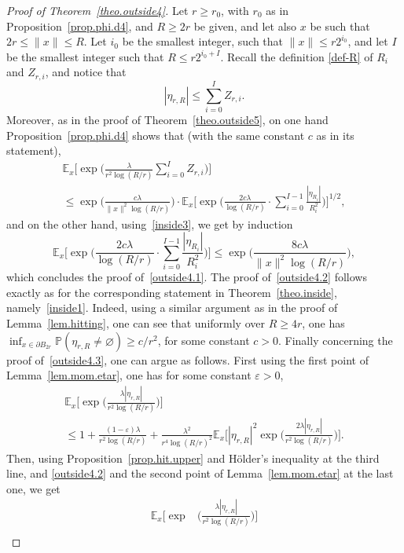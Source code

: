 \documentclass[JEP,XML,SOM,Unicode,NoFloatCountersInSection,published]{cedram}
\let\ts\textstyle
\theoremstyle{plain}
\theoremstyle{definition}
\newcommand{\1}{{\text{\Large $\mathfrak 1$}}}
\begin{document}
\begin{proof}[Proof of Theorem~\ref{theo.outside4}]
Let $r\ge r_0$, with $r_0$ as in Proposition~\ref{prop.phi.d4}, and $R\ge 2r$ be given, and let also $x$ be such
that $2r\le \|x\|\le R$. Let $i_0$ be the smallest integer,
such that $\|x\|\le r2^{i_0}$,
and let $I$ be the smallest integer such that $R\le r2^{i_0+I}$.
Recall the definition \eqref{def-R} of $R_i$ and $Z_{r,i}$, and notice that
\[
|\eta_{r,R}| \le \sum_{i=0}^I Z_{r,i}.
\]
Moreover, as in the proof of Theorem~\ref{theo.outside5}, on one hand Proposition~\ref{prop.phi.d4} shows that (with the same constant $c$ as in its statement),
\begin{multline*}
\mathbb E_x\Big[\exp\Big(\frac{\lambda}{r^2\log(R/r)}
{\ts\sum_{i=0}^I} Z_{r,i}\Big)\Big]\\
\le\exp\Big(\frac{c\lambda}{\|x\|^2\log(R/r)}\Big)
\cdot \mathbb E_x\Big[ \exp\Big(\frac{2c\lambda}{\log(R/r)}
\cdot {\ts\sum_{i=0}^{I-1}} \frac{ |\eta_{R_i}|}{R_i^2}\Big)\Big]^{1/2},
\end{multline*}
and on the other hand, using~\eqref{inside3}, we get by induction
\[
\mathbb E_x\Big[ \exp\Big(\frac{2c\lambda}{\log(R/r)}\cdot {\ts\sum_{i=0}^{I-1}}
\frac{ |\eta_{R_i}|}{R_i^2}\Big)\Big]
\le \exp\Big(\frac{8c\lambda}{\|x\|^2 \log(R/r)}\Big),
\]
which concludes the proof of~\eqref{outside4.1}. The proof of~\eqref{outside4.2} follows exactly as for the corresponding statement
in Theorem~\ref{theo.inside}, namely~\eqref{inside1}. Indeed, using a similar argument as in the proof of Lemma~\ref{lem.hitting},
one can see that uniformly over $R\ge 4r$, one has $\inf_{x\in \partial B_{2r}} \mathbb P(\eta_{r,R}\neq \varnothing) \ge c/r^2$, for some constant $c>0$. Finally concerning the proof of~\eqref{outside4.3},
one can argue as follows. First using the first point of Lemma~\ref{lem.mom.etar}, one has for some constant $\varepsilon>0$,
\begin{multline*}
\mathbb E_x\Big[\exp\Big(\frac{\lambda|\eta_{r,R}|}{r^2\log(R/r)}\Big)\Big]\\
\le 1+\frac{(1-\varepsilon)\lambda}{r^2\log(R/r)} + \frac{\lambda^2}{r^4\log(R/r)^2}
\mathbb E_x\Big[|\eta_{r,R}|^2\exp\Big(\frac{2\lambda|\eta_{r,R}|}{r^2\log(R/r)}\Big)\Big].
\end{multline*}
Then, using Proposition~\ref{prop.hit.upper} and Hölder's inequality at the third line, and \eqref{outside4.2} and the second point of Lemma~\ref{lem.mom.etar} at the last one, we get
\begin{align*}
\mathbb E_x\Big[\exp&\Big(\frac{\lambda|\eta_{r,R}|}{r^2\log(R/r)}\Big)\Big]\\

\end{align*}
\end{proof}
\end{document}
